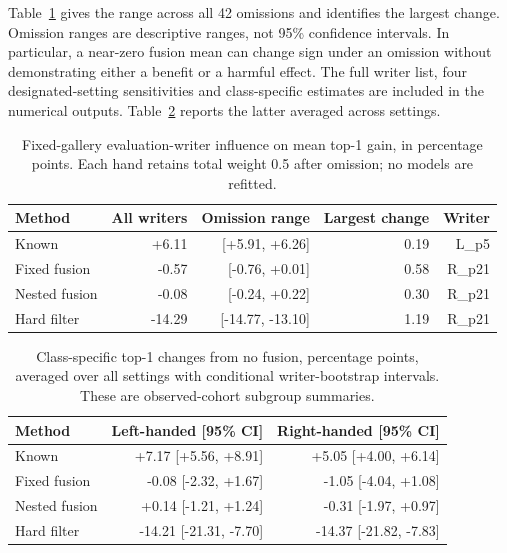 \documentclass[10pt,a4paper]{article}
\begin{document}
Table~\ref{tab:writerinfluence} gives the range across all 42 omissions and identifies the largest change. Omission ranges are descriptive ranges, not 95\% confidence intervals. In particular, a near-zero fusion mean can change sign under an omission without demonstrating either a benefit or a harmful effect. The full writer list, four designated-setting sensitivities and class-specific estimates are included in the numerical outputs. Table~\ref{tab:classeffects} reports the latter averaged across settings.

\begin{table}[ht]
\centering\small
\caption{Fixed-gallery evaluation-writer influence on mean top-1 gain, in percentage points. Each hand retains total weight 0.5 after omission; no models are refitted.}\label{tab:writerinfluence}
\begin{tabular}{lrrrr}\toprule
Method & All writers & Omission range & Largest change & Writer\\\midrule
Known & +6.11 & [+5.91, +6.26] & 0.19 & L\_p5 \\
Fixed fusion & -0.57 & [-0.76, +0.01] & 0.58 & R\_p21 \\
Nested fusion & -0.08 & [-0.24, +0.22] & 0.30 & R\_p21 \\
Hard filter & -14.29 & [-14.77, -13.10] & 1.19 & R\_p21 \\
\bottomrule

\end{tabular}
\end{table}

\begin{table}[ht]
\centering\small
\caption{Class-specific top-1 changes from no fusion, percentage points, averaged over all settings with conditional writer-bootstrap intervals. These are observed-cohort subgroup summaries.}\label{tab:classeffects}
\begin{tabular}{lrr}\toprule
Method & Left-handed [95\% CI] & Right-handed [95\% CI]\\\midrule
Known & +7.17 [+5.56, +8.91] & +5.05 [+4.00, +6.14] \\
Fixed fusion & -0.08 [-2.32, +1.67] & -1.05 [-4.04, +1.08] \\
Nested fusion & +0.14 [-1.21, +1.24] & -0.31 [-1.97, +0.97] \\
Hard filter & -14.21 [-21.31, -7.70] & -14.37 [-21.82, -7.83] \\
\bottomrule

\end{tabular}
\end{table}
\end{document}
